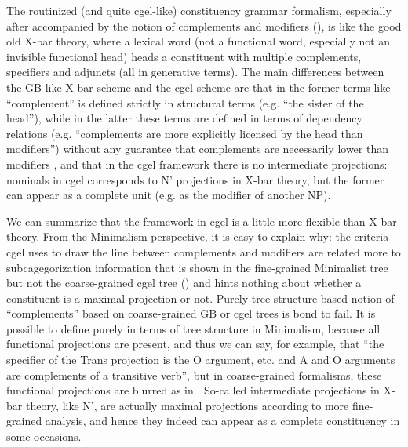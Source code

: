 \documentclass[../main.tex]{subfiles}
\begin{document}
The routinized (and quite \ac{cgel}-like) constituency grammar formalism, 
especially after accompanied by the notion of complements and modifiers (), 
is like the good old X-bar theory, where a lexical word 
(not a functional word, especially not an invisible functional head) heads a constituent 
with multiple complements, specifiers and adjuncts (all in generative terms). 
The main differences between the GB-like X-bar scheme and the \ac{cgel} scheme are 
that in the former terms like ``complement'' is defined strictly in structural terms 
(e.g. ``the sister of the head''), 
while in the latter these terms are defined in terms of dependency relations 
(e.g. ``complements are more explicitly licensed by the head than modifiers'') 
without any guarantee that complements are necessarily lower than modifiers \citep{payne2007fusion},
and that in the \ac{cgel} framework there is no intermediate projections: 
nominals in \ac{cgel} corresponds to N' projections in X-bar theory, 
but the former can appear as a complete unit (e.g. as the modifier of another NP). 

We can summarize that the framework in \ac{cgel} is a little more flexible than X-bar theory. 
From the Minimalism perspective, it is easy to explain why: 
the criteria \ac{cgel} uses to draw the line between complements and modifiers are related 
more to subcagegorization information that is shown in the fine-grained Minimalist tree 
but not the coarse-grained \ac{cgel} tree () 
and hints nothing about whether a constituent is a maximal projection or not. 
Purely tree structure-based notion of ``complements'' 
based on coarse-grained GB or \ac{cgel} trees 
is bond to fail. 
It is possible to define  purely in terms of tree structure in Minimalism,
because all functional projections are present, 
and thus we can say, for example, 
that ``the specifier of the Trans projection is the O argument, etc. 
and A and O arguments are complements of a transitive verb'',
but in coarse-grained formalisms, 
these functional projections are blurred as in .
So-called intermediate projections in X-bar theory, like N', 
are actually maximal projections according to more fine-grained analysis, 
and hence they indeed can appear as a complete constituency in some occasions.
\end{document}
